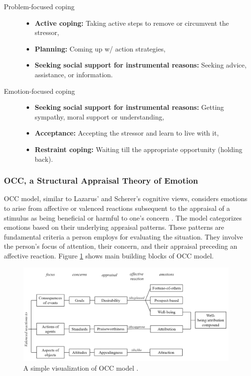 \documentclass[11pt]{article}
\begin{document}
\begin{description}
  \item[Problem-focused coping] \hfill
	\begin{itemize}
	  \item \textbf{Active coping:} Taking active steps to remove or circumvent the
	  stressor,
	  \item \textbf{Planning:} Coming up w/ action strategies,
	  \item \textbf{Seeking social support for instrumental reasons:} Seeking
	  advice, assistance, or information.
	\end{itemize}
  \item[Emotion-focused coping] \hfill
    \begin{itemize}
	  \item \textbf{Seeking social support for instrumental reasons:} Getting
	  sympathy, moral support or understanding,
	  \item \textbf{Acceptance:} Accepting the stressor and learn to live with it,
	  \item \textbf{Restraint coping:} Waiting till the appropriate opportunity
	  (holding back).
	\end{itemize}
\end{description}

\subsubsection{OCC, a Structural Appraisal Theory of Emotion}

OCC model, similar to Lazarus' \cite{lazarus:cognitive-theory-emotion} and
Scherer's \cite{scherer:nature-function-emotion} cognitive views, considers
emotions to arise from affective or valenced reactions subsequent to the
appraisal of a stimulus as being beneficial or harmful to one’s concern
\cite{occ:structure}. The model categorizes emotions based on their underlying
appraisal patterns. These patterns are fundamental criteria a person employs for
evaluating the situation. They involve the person’s focus of attention, their
concern, and their appraisal preceding an affective reaction. Figure
\ref{fig:occ-model} shows main building blocks of OCC model.

\begin{figure}[tbh]
  \center
  \includegraphics[width=\textwidth]{figure/occ.png}
  \caption{A simple visualization of OCC model \cite{occ:structure}.}
  \label{fig:occ-model}
\end{figure}
\end{document}
